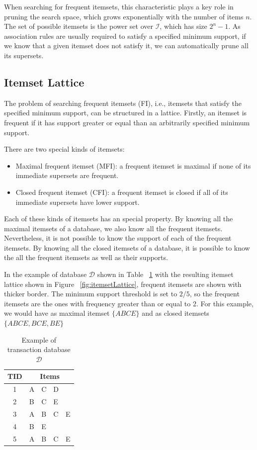 When searching for frequent itemsets, this characteristic plays a key role in pruning the search space, which grows
exponentially with the number of items $n$. The set of possible itemsets is the power set over $\mathcal{I}$, which
has
size $2^n-1$. As association rules are usually required to satisfy a specified minimum support, if we know that a
given
itemset does not satisfy it, we can automatically prune all its supersets.

\subsection{Itemset Lattice}

The problem of searching frequent itemsets (FI), i.e., itemsets that satisfy the specified minimum support, can be
structured in a lattice. Firstly, an itemset is frequent if it has support greater or equal than an arbitrarily
specified minimum support.


There are two special kinds of itemsets:
\begin{itemize}
 \item Maximal frequent itemset (MFI): a frequent itemset is maximal if none of its immediate supersets are frequent.
 \item Closed frequent itemset (CFI): a frequent itemset is closed if all of its immediate supersets have lower
support.
\end{itemize}

Each of these kinds of itemsets has an special property. By knowing all the maximal itemsets of a database, we
also know all the frequent itemsets. Nevertheless, it is not possible to know the support of each of the frequent
itemsets. By knowing all the closed itemsets of a database, it is possible to know the all the frequent itemsets as
well as their supports.

In the example of database $\mathcal{D}$ shown in Table ~\ref{tab:itemsetLattice} with the resulting itemset lattice
shown in Figure ~\ref{fig:itemsetLattice}, frequent itemsets are shown with thicker border. The minimum support
threshold is set to $2/5$, so the frequent itemsets are the ones with frequency greater than or equal to 2. For this
example, we would have as maximal itemset $\{ABCE\}$ and as closed itemsets $\{ABCE, BCE, BE\}$

\begin{table}[h!]
  \begin{center}
    \label{tab:itemsetLattice}
      \begin{tabular}{ c | l l l l }
      \toprule
      \textbf{TID} & \multicolumn{4}{c}{\textbf{Items}} \\
      \midrule
	1	& A & C & D & \\
	2 	& B & C & E & \\
	3	& A & B & C & E \\
	4 	& B & E &   & \\
	5	& A & B & C & E \\
      \bottomrule
      \end{tabular}
  \caption{Example of transaction database $\mathcal{D}$ \cite{Pasquier99efficientmining}}
  \end{center}
\end{table}

